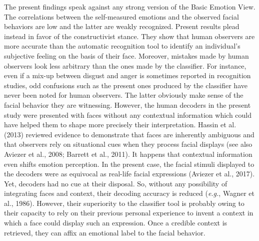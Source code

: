 \documentclass[
  english,
  doc]{apa7}
\begin{document}
The present findings speak against any strong version of the Basic Emotion View. The correlations between the self-measured emotions and the observed facial behaviors are low and the latter are weakly recognized. Present results plead instead in favor of the constructivist stance. They show that human observers are more accurate than the automatic recognition tool to identify an individual's subjective feeling on the basis of their face. Moreover, mistakes made by human observers look less arbitrary than the ones made by the classifier. For instance, even if a mix-up between disgust and anger is sometimes reported in recognition studies, odd confusions such as the present ones produced by the classifier have never been noted for human observers. The latter obviously make sense of the facial behavior they are witnessing. However, the human decoders in the present study were presented with faces without any contextual information which could have helped them to shape more precisely their interpretation. Hassin et al. (2013) reviewed evidence to demonstrate that faces are inherently ambiguous and that observers rely on situational cues when they process facial displays (see also Aviezer et al., 2008; Barrett et al., 2011). It happens that contextual information even shifts emotion perception. In the present case, the facial stimuli displayed to the decoders were as equivocal as real-life facial expressions (Aviezer et al., 2017). Yet, decoders had no cue at their disposal. So, without any possibility of integrating faces and context, their decoding accuracy is reduced (\emph{e.g.}, Wagner et al., 1986). However, their superiority to the classifier tool is probably owing to their capacity to rely on their previous personal experience to invent a context in which a face could display such an expression. Once a credible context is retrieved, they can affix an emotional label to the facial behavior.
\end{document}
